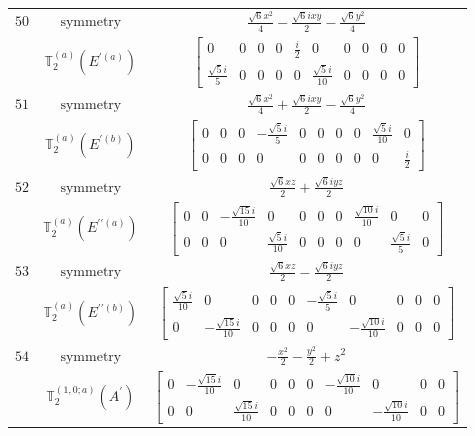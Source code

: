 \documentclass[fleqn,8pt,landscape]{jsarticle}
\begin{document}
\begin{longtable}{ccc}
$ 50 $ & $ \text{symmetry} $ & $ \frac{\sqrt{6} x^{2}}{4} - \frac{\sqrt{6} i x y}{2} - \frac{\sqrt{6} y^{2}}{4} $ \\
$  $ & $ \mathbb{T}_{2}^{(a)}(E^{\prime(a)}) $ & $ \begin{bmatrix} 0 & 0 & 0 & 0 & \frac{i}{2} & 0 & 0 & 0 & 0 & 0 \\ \frac{\sqrt{5} i}{5} & 0 & 0 & 0 & 0 & \frac{\sqrt{5} i}{10} & 0 & 0 & 0 & 0 \end{bmatrix} $ \\ \hline
$ 51 $ & $ \text{symmetry} $ & $ \frac{\sqrt{6} x^{2}}{4} + \frac{\sqrt{6} i x y}{2} - \frac{\sqrt{6} y^{2}}{4} $ \\
$  $ & $ \mathbb{T}_{2}^{(a)}(E^{\prime(b)}) $ & $ \begin{bmatrix} 0 & 0 & 0 & - \frac{\sqrt{5} i}{5} & 0 & 0 & 0 & 0 & \frac{\sqrt{5} i}{10} & 0 \\ 0 & 0 & 0 & 0 & 0 & 0 & 0 & 0 & 0 & \frac{i}{2} \end{bmatrix} $ \\ \hline
$ 52 $ & $ \text{symmetry} $ & $ \frac{\sqrt{6} x z}{2} + \frac{\sqrt{6} i y z}{2} $ \\
$  $ & $ \mathbb{T}_{2}^{(a)}(E^{\prime\prime(a)}) $ & $ \begin{bmatrix} 0 & 0 & - \frac{\sqrt{15} i}{10} & 0 & 0 & 0 & 0 & \frac{\sqrt{10} i}{10} & 0 & 0 \\ 0 & 0 & 0 & \frac{\sqrt{5} i}{10} & 0 & 0 & 0 & 0 & \frac{\sqrt{5} i}{5} & 0 \end{bmatrix} $ \\ \hline
$ 53 $ & $ \text{symmetry} $ & $ \frac{\sqrt{6} x z}{2} - \frac{\sqrt{6} i y z}{2} $ \\
$  $ & $ \mathbb{T}_{2}^{(a)}(E^{\prime\prime(b)}) $ & $ \begin{bmatrix} \frac{\sqrt{5} i}{10} & 0 & 0 & 0 & 0 & - \frac{\sqrt{5} i}{5} & 0 & 0 & 0 & 0 \\ 0 & - \frac{\sqrt{15} i}{10} & 0 & 0 & 0 & 0 & - \frac{\sqrt{10} i}{10} & 0 & 0 & 0 \end{bmatrix} $ \\ \hline
$ 54 $ & $ \text{symmetry} $ & $ - \frac{x^{2}}{2} - \frac{y^{2}}{2} + z^{2} $ \\
$  $ & $ \mathbb{T}_{2}^{(1,0;a)}(A^{\prime}) $ & $ \begin{bmatrix} 0 & - \frac{\sqrt{15} i}{10} & 0 & 0 & 0 & 0 & - \frac{\sqrt{10} i}{10} & 0 & 0 & 0 \\ 0 & 0 & \frac{\sqrt{15} i}{10} & 0 & 0 & 0 & 0 & - \frac{\sqrt{10} i}{10} & 0 & 0 \end{bmatrix} $ \\ \hline

\end{longtable}
\end{document}
